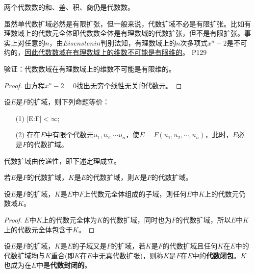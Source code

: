 \begin{corollary}
	两个代数数的和、差、积、商仍是代数数。
\end{corollary}

\original
{
	虽然单代数扩域必然是有限扩张，但一般来说，代数扩域不必是有限扩张。比如有理数域上的代数元全体即代数数全体是有理数域的代数扩张，但不是有限扩张。事实上对任意的$n$，由$Eisenstenin$判别法知，有理数域上的$n$次多项式$x^{n}-2$是不可约的，\uline{因此代数数域在有理数域上的维数不可能是有限维的}。
}
{P129}

\begin{proposition}
	验证：代数数域在有理数域上的维数不可能是有限维的。
\end{proposition}

\begin{proof}
	由方程$x^{n}-2=0$找出无穷个线性无关的代数元。
\end{proof}

\begin{theorem}
	设$E$是$F$的扩域，则下列命题等价：
	\begin{enumerate}
		\item[(1)] [E:F]$<\infty$;
		\item[(2)] 存在$E$中有限个代数元$u_{1},u_{2},\cdots u_{n}$，使$E=F(u_{1},u_{2},\cdots,u_{n})$，此时，$E$必是$F$的代数扩域。
	\end{enumerate}
\end{theorem}


代数扩域由传递性，即下述定理成立。
\begin{theorem}
	若$E$是$F$的代数扩域，$K$是$E$的代数扩域，则$K$是$F$的代数扩域。
\end{theorem}

\begin{corollary}
	设$E$是$F$的扩域，$K$是$E$中$F$上代数元全体组成的子域，则任何$E$中$K$上的代数元仍数域$K$。
\end{corollary}

\begin{proof}
	$E$中$K$上的代数元全体为$K$的代数扩域，同时也为$F$的代数扩域，所以$E$中$K$上的代数元全体包含于$K$。
\end{proof}

\begin{definition}
	设$E$是$F$的扩域，$K$是$E$的子域又是$F$的扩域，若$K$是$F$的代数扩域且任何$K$在$E$中的代数扩域均与$K$重合(即$K$在$E$中无真代数扩张)，则称$K$是$F$在$E$中的\textbf{代数闭包}。$K$也成为在$E$中是\textbf{代数封闭的}。
\end{definition}









